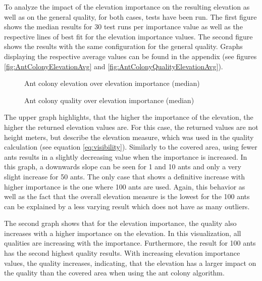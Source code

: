To analyze the impact of the elevation importance on the resulting elevation as well as on the general quality, for both cases, tests have been run.
The first figure shows the median results for 30 test runs per importance value as well as the respective lines of best fit for the elevation importance values.
The second figure shows the results with the same configuration for the general quality.
Graphs displaying the respective average values can be found in the appendix (see figures \ref{fig:AntColonyElevationAvg} and \ref{fig:AntColonyQualityElevationAvg}).


\begin{figure}[H]
	\centering
	
	\caption{Ant colony elevation over elevation importance (median)}
	\label{fig:AntColonyElevationMed}
\end{figure}



\begin{figure}[H]
	\centering
	
	\caption{Ant colony quality over elevation importance (median)}
	\label{fig:AntColonyQualityElevationMed}
\end{figure}


The upper graph highlights, that the higher the importance of the elevation, the higher the returned elevation values are. 
For this case, the returned values are not height meters, but describe the elevation measure, which was used in the quality calculation (see equation \ref{eq:visibility}).
Similarly to the covered area, using fewer ants results in a slightly decreasing value when the importance is increased. 
In this graph, a downwards slope can be seen for 1 and 10 ants and only a very slight increase for 50 ants.
The only case that shows a definitive increase with higher importance is the one where 100 ants are used.
Again, this behavior as well as the fact that the overall elevation measure is the lowest for the 100 ants can be explained by a less varying result which does not have as many outliers.


The second graph shows that for the elevation importance, the quality also increases with a higher importance on the elevation.
In this visualization, all qualities are increasing with the importance.
Furthermore, the result for 100 ants has the second highest quality results.
With increasing elevation importance values, the quality increases, indicating, that the elevation has a larger impact on the quality than the covered area when using the ant colony algorithm. 




